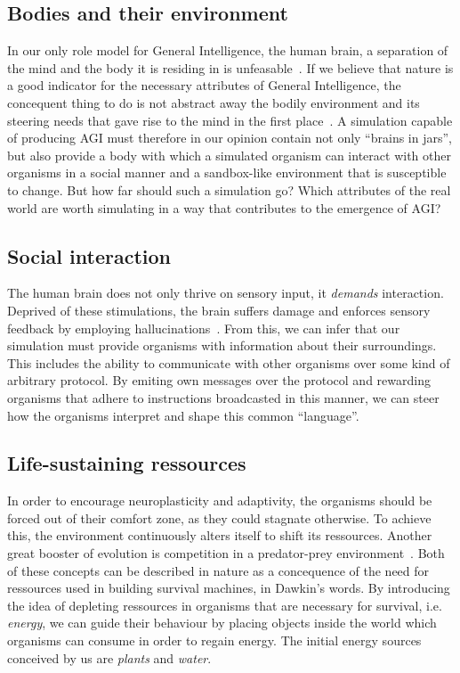 \subsection{Bodies and their environment}
In our only role model for General Intelligence, the human brain, a separation of the mind and
the body it is residing in is unfeasable~\cite{Dudai2014}. If we believe that nature is a good 
indicator for the necessary attributes of General Intelligence, the concequent thing to do is not 
abstract away the bodily environment and its steering needs that gave rise to the mind in the first place~\cite{Jekely2010}. 
A simulation capable of producing AGI must therefore in our opinion contain not only ``brains in jars'', but 
also provide a body with which a simulated organism can interact with other organisms in a social manner and a 
sandbox-like environment that is susceptible to change.
But how far should such a simulation go? Which attributes of the real world are worth simulating in a way 
that contributes to the emergence of AGI\@?

\subsection{Social interaction}
The human brain does not only thrive on sensory input, it
\emph{demands} interaction. Deprived of these stimulations,
the brain suffers damage and enforces sensory feedback by employing
hallucinations~\cite{Grassian2006}. From this, we can infer that
our simulation must provide organisms with information about their surroundings.
This includes the ability to communicate with other organisms over some
kind of arbitrary protocol. By emiting own messages over the protocol and
rewarding organisms that adhere to instructions broadcasted in this manner,
we can steer how the organisms interpret and shape this common ``language''.

\subsection{Life-sustaining ressources}
In order to encourage neuroplasticity and adaptivity, the organisms should be 
forced out of their comfort zone, as they could stagnate otherwise.
To achieve this, the environment continuously alters itself to shift its ressources.
Another great booster of evolution is competition in a predator-prey environment~\cite{Dawkins1982}.
Both of these concepts can be described in nature as a concequence of the need for ressources 
used in building survival machines, in Dawkin's words. 
By introducing the idea of depleting ressources in organisms that are necessary for survival, 
i.e. \emph{energy}, we can guide their behaviour by placing objects inside the world which organisms can consume
in order to regain energy. The initial energy sources conceived by us are \emph{plants} and \emph{water}.

